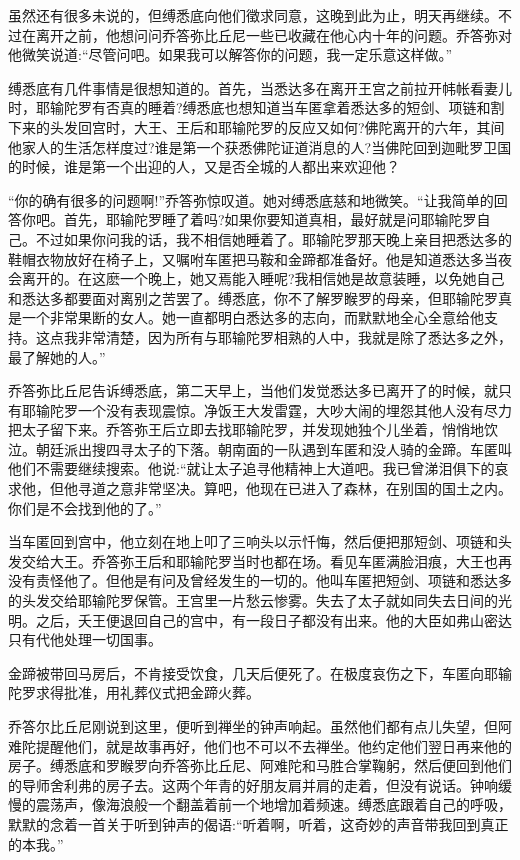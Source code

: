 \documentclass[12pt,twoside,openany]{book}
\begin{document}
虽然还有很多未说的，但缚悉底向他们徵求同意，这晚到此为止，明天再继续。不过在离开之前，他想问问乔答弥比丘尼一些已收藏在他心内十年的问题。乔答弥对他微笑说道:“尽管问吧。如果我可以解答你的问题，我一定乐意这样做。”

缚悉底有几件事情是很想知道的。首先，当悉达多在离开王宫之前拉开帏帐看妻儿时，耶输陀罗有否真的睡着?缚悉底也想知道当车匿拿着悉达多的短剑、项链和割下来的头发回宫时，大王、王后和耶输陀罗的反应又如何?佛陀离开的六年，其间他家人的生活怎样度过?谁是第一个获悉佛陀证道消息的人?当佛陀回到迦毗罗卫国的时候，谁是第一个出迎的人，又是否全城的人都出来欢迎他？

“你的确有很多的问题啊!”乔答弥惊叹道。她对缚悉底慈和地微笑。“让我简单的回答你吧。首先，耶输陀罗睡了着吗?如果你要知道真相，最好就是问耶输陀罗自己。不过如果你问我的话，我不相信她睡着了。耶输陀罗那天晚上亲目把悉达多的鞋帽衣物放好在椅子上，又嘱咐车匿把马鞍和金蹄都准备好。他是知道悉达多当夜会离开的。在这麽一个晚上，她又焉能入睡呢?我相信她是故意装睡，以免她自己和悉达多都要面对离别之苦罢了。缚悉底，你不了解罗睺罗的母亲，但耶输陀罗真是一个非常果断的女人。她一直都明白悉达多的志向，而默默地全心全意给他支持。这点我非常清楚，因为所有与耶输陀罗相熟的人中，我就是除了悉达多之外，最了解她的人。”

乔答弥比丘尼告诉缚悉底，第二天早上，当他们发觉悉达多已离开了的时候，就只有耶输陀罗一个没有表现震惊。净饭王大发雷霆，大吵大闹的埋怨其他人没有尽力把太子留下来。乔答弥王后立即去找耶输陀罗，并发现她独个儿坐着，悄悄地饮泣。朝廷派出搜四寻太子的下落。朝南面的一队遇到车匿和没人骑的金蹄。车匿叫他们不需要继续搜索。他说:“就让太子追寻他精神上大道吧。我已曾涕泪俱下的哀求他，但他寻道之意非常坚决。算吧，他现在已进入了森林，在别国的国土之内。你们是不会找到他的了。”

当车匿回到宫中，他立刻在地上叩了三响头以示忏悔，然后便把那短剑、项链和头发交给大王。乔答弥王后和耶输陀罗当时也都在场。看见车匿满脸泪痕，大王也再没有责怪他了。但他是有问及曾经发生的一切的。他叫车匿把短剑、项链和悉达多的头发交给耶输陀罗保管。王宫里一片愁云惨雾。失去了太子就如同失去日间的光明。之后，夭王便退回自己的宫中，有一段日子都没有出来。他的大臣如弗山密达只有代他处理一切国事。

金蹄被带回马房后，不肯接受饮食，几天后便死了。在极度哀伤之下，车匿向耶输陀罗求得批准，用礼葬仪式把金蹄火葬。

乔答尔比丘尼刚说到这里，便听到禅坐的钟声响起。虽然他们都有点儿失望，但阿难陀提醒他们，就是故事再好，他们也不可以不去禅坐。他约定他们翌日再来他的房子。缚悉底和罗睺罗向乔答弥比丘尼、阿难陀和马胜合掌鞠躬，然后便回到他们的导师舍利弗的房子去。这两个年青的好朋友肩并肩的走着，但没有说话。钟响缓慢的震荡声，像海浪般一个翻盖着前一个地增加着频速。缚悉底跟着自己的呼吸，默默的念着一首关于听到钟声的偈语:“听着啊，听着，这奇妙的声音带我回到真正的本我。”
\end{document}
